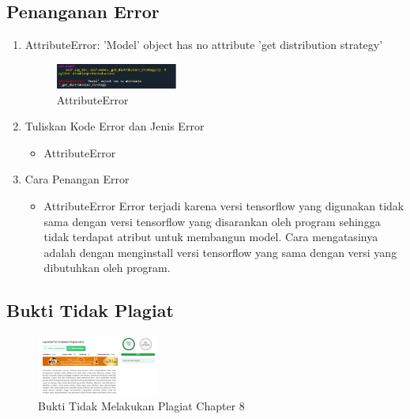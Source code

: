 \subsection{Penanganan Error}
\begin{enumerate}
	\item AttributeError: 'Model' object has no attribute 'get distribution strategy'
	\begin{figure}[H]
		\includegraphics[width=4cm]{figures/1174077/8/error.PNG}
		\centering
		\caption{AttributeError}
	\end{figure}
	\item Tuliskan Kode Error dan Jenis Error
	\begin{itemize}
		\item AttributeError
	\end{itemize}
	\item Cara Penangan Error
	\begin{itemize}
		\item AttributeError
		\hfill\break
		Error terjadi karena versi tensorflow yang digunakan tidak sama dengan versi tensorflow yang disarankan oleh program sehingga tidak terdapat atribut untuk membangun model. Cara mengatasinya adalah dengan menginstall versi tensorflow yang sama dengan versi yang dibutuhkan oleh program. 
	\end{itemize}
\end{enumerate}

\subsection{Bukti Tidak Plagiat}
\begin{figure}[H]
\centering
	\includegraphics[width=4cm]{figures/1174077/8/plagiarisme.PNG}
	\caption{Bukti Tidak Melakukan Plagiat Chapter 8}
\end{figure}
